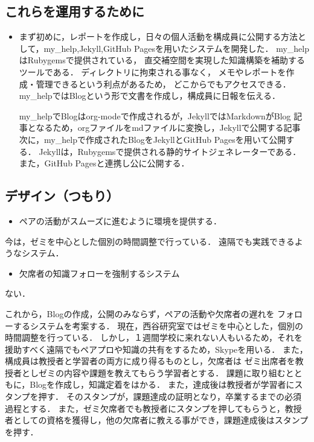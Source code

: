 \documentclass{jsarticle}
\begin{document}
\subsection{これらを運用するために}
\label{sec:orgf130331}
\begin{itemize}
\item まず初めに，レポートを作成し，日々の個人活動を構成員に公開する方法として，my\_help,Jekyll,GitHub Pagesを用いたシステムを開発した．
my\_helpはRubygemsで提供されている，
直交補空間を実現した知識構築を補助するツールである．
ディレクトリに拘束される事なく，
メモやレポートを作成・管理できるという利点があるため，
どこからでもアクセスできる．
my\_helpではBlogという形で文書を作成し，構成員に日報を伝える．

my\_helpでBlogはorg-modeで作成されるが，JekyllではMarkdownがBlog
記事となるため，orgファイルをmdファイルに変換し，Jekyllで公開する記事
次に，my\_helpで作成されたBlogをJekyllとGitHub Pagesを用いて公開する．
Jekyllは，Rubygemsで提供される静的サイトジェネレーターである．
また，GitHub Pagesと連携し公に公開する．
\end{itemize}


\subsection{デザイン（つもり）}
\label{sec:org7f28c3d}
\begin{itemize}
\item ペアの活動がスムーズに進むように環境を提供する．
\end{itemize}
今は，ゼミを中心とした個別の時間調整で行っている．
遠隔でも実践できるようなシステム．
\begin{itemize}
\item 欠席者の知識フォローを強制するシステム
\end{itemize}
ない．

これから，Blogの作成，公開のみならず，ペアの活動や欠席者の遅れを
フォローするシステムを考案する．
現在，西谷研究室ではゼミを中心とした，個別の時間調整を行っている．
しかし，１週間学校に来れない人もいるため，それを援助すべく遠隔でもペアプロや知識の共有をするため，Skypeを用いる．
また，構成員は教授者と学習者の両方に成り得るものとし，欠席者は
ゼミ出席者を教授者としゼミの内容や課題を教えてもらう学習者とする．
課題に取り組むとともに，Blogを作成し，知識定着をはかる．
また，達成後は教授者が学習者にスタンプを押す．
そのスタンプが，課題達成の証明となり，卒業するまでの必須
過程とする．
また，ゼミ欠席者でも教授者にスタンプを押してもらうと，教授者としての資格を獲得し，他の欠席者に教える事ができ，課題達成後はスタンプを押す．
\end{document}
